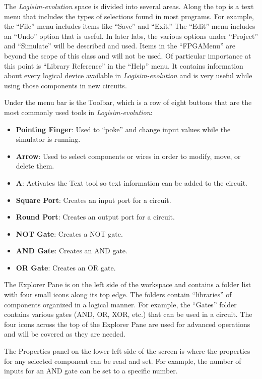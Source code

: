 The \textit{Logisim-evolution} space is divided into several areas. Along the top is a text menu that includes the types of selections found in most programs. For example, the ``File'' menu includes items like ``Save'' and ``Exit.'' The ``Edit'' menu includes an ``Undo'' option that is useful. In later labs, the various options under ``Project'' and ``Simulate'' will be described and used. Items in the ``FPGAMenu'' are beyond the scope of this class and will not be used. Of particular importance at this point is ``Library Reference'' in the ``Help'' menu. It contains information about every logical device available in \textit{Logisim-evolution} and is very useful while using those components in new circuits. 

Under the menu bar is the Toolbar, which is a row of eight buttons that are the most commonly used tools in \textit{Logisim-evolution}: 

\begin{itemize}
	\item \textbf{Pointing Finger}: Used to ``poke'' and change input values while the simulator is running. 
	\item \textbf{Arrow}: Used to select components or wires in order to modify, move, or delete them. 
	\item \textbf{A}: Activates the Text tool so text information can be added to the circuit. 
	\item \textbf{Square Port}: Creates an input port for a circuit. 
	\item \textbf{Round Port}: Creates an output port for a circuit. 
	\item \textbf{NOT Gate}: Creates a NOT gate. 
	\item \textbf{AND Gate}: Creates an AND gate. 
	\item \textbf{OR Gate}: Creates an OR gate. 
\end{itemize}

The Explorer Pane is on the left side of the workspace and contains a folder list with four small icons along its top edge. The folders contain ``libraries'' of components organized in a logical manner. For example, the ``Gates'' folder contains various gates (AND, OR, XOR, etc.) that can be used in a circuit. The four icons across the top of the Explorer Pane are used for advanced operations and will be covered as they are needed. 

The Properties panel on the lower left side of the screen is where the properties for any selected component can be read and set. For example, the number of inputs for an AND gate can be set to a specific number.

